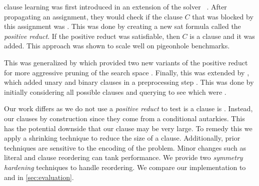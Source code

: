 \pr clause learning was first introduced in an extension of the solver \lingeling~\cite{prclause}. After propagating an assignment, they would check if the clause $C$ that was blocked by this assignment was \pr. This was done by creating a new sat formula called the \emph{positive reduct}. If the positive reduct was satisfiable, then $C$ is a \pr clause and it was added. This approach was shown to scale well on pigeonhole benchmarks.

This was generalized by \sadical which provided two new variants of the positive reduct for more aggressive pruning of the search space \cite{sadical}. Finally, this was extended by \prelearn, which added unary and binary \pr clauses in a preprocessing step \cite{prelearn}. This was done by initially considering all possible clauses and querying \sadical to see which were \pr.

Our work differs as we do not use a \emph{positive reduct} to test is a clause is \pr. Instead, our clauses \pr by construction since they come from a conditional autarkies. This has the potential downside that our clause may be very large. To remedy this we apply a shrinking technique to reduce the size of a clause. Additionally, prior techniques are sensitive to the encoding of the problem. Minor changes such as literal and clause reordering can tank performance. We provide two \emph{symmetry hardening} techniques to handle reordering. We compare our implementation \tool to \sadical and \prelearn in \autoref{sec:evaluation}.